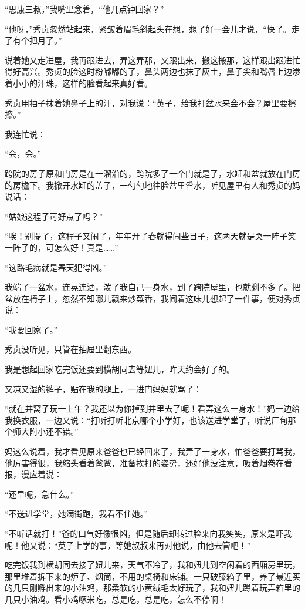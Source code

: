 \par “思康三叔，”我嘴里念着，“他几点钟回家？”
\par “他呀，”秀贞忽然站起来，紧皱着眉毛斜起头在想，想了好一会儿才说，“快了。走了有个把月了。”
\par 说着她又走进屋，我再跟进去，弄这弄那，又跟出来，搬这搬那，这样跟出跟进忙得好高兴。秀贞的脸这时粉嘟嘟的了，鼻头两边也抹了灰土，鼻子尖和嘴唇上边渗着小小的汗珠，这样的脸看起来真好看。
\par 秀贞用袖子抹着她鼻子上的汗，对我说：“英子，给我打盆水来会不会？屋里要擦擦。”
\par 我连忙说：
\par “会，会。”
\par 跨院的房子原和门房是在一溜沿的，跨院多了一个门就是了，水缸和盆就放在门房的房檐下。我掀开水缸的盖子，一勺勺地往脸盆里舀水，听见屋里有人和秀贞的妈说话：
\par “姑娘这程子可好点了吗？”
\par “唉！别提了，这程子又闹了，年年开了春就得闹些日子，这两天就是哭一阵子笑一阵子的，可怎么好！真是……”
\par “这路毛病就是春天犯得凶。”
\par 我端了一盆水，连晃连洒，泼了我自己一身水，到了跨院屋里，也就剩不多了。把盆放在椅子上，忽然不知哪儿飘来炒菜香，我闻着这味儿想起了一件事，便对秀贞说：
\par “我要回家了。”
\par 秀贞没听见，只管在抽屉里翻东西。
\par 我是想起回家吃完饭还要到横胡同去等妞儿，昨天约会好了的。
\par 又凉又湿的裤子，贴在我的腿上，一进门妈妈就骂了：
\par “就在井窝子玩一上午？我还以为你掉到井里去了呢！看弄这么一身水！”妈一边给我换衣服，一边又说：“打听打听北京哪个小学好，也该送进学堂了，听说厂甸那个师大附小还不错。”
\par 妈这么说着，我才看见原来爸爸也已经回来了，我弄了一身水，怕爸爸要打骂我，他厉害得很，我缩头看着爸爸，准备挨打的姿势，还好他没注意，吸着烟卷在看报，漫应着说：
\par “还早呢，急什么。”
\par “不送进学堂，她满街跑，我看不住她。”
\par “不听话就打！”爸的口气好像很凶，但是随后却转过脸来向我笑笑，原来是吓我呢！他又说：“英子上学的事，等她叔叔来再对他说，由他去管吧！”
\par 吃完饭我到横胡同去接了妞儿来，天气不冷了，我和妞儿到空闲着的西厢房里玩，那里堆着拆下来的炉子、烟筒，不用的桌椅和床铺。一只破藤箱子里，养了最近买的几只刚孵出来的小油鸡，那柔软的小黄绒毛太好玩了，我和妞儿蹲着玩弄箱里的几只小油鸡。看小鸡啄米吃，总是吃，总是吃，怎么不停啊！
